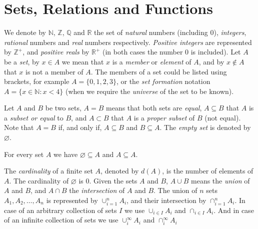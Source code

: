 %
%

\section{Sets, Relations and Functions}
\label{sec:sets}

We denote by $\mathbb{N}$, $\mathbb{Z}$, $\mathbb{Q}$ and $\mathbb{R}$ the set of \emph{natural} numbers (including $0$), \emph{integers}, \emph{rational} numbers and \emph{real} numbers respectively. \emph{Positive integers} are represented by $\mathbb{Z}^+$, and \emph{positive reals} by $\mathbb{R}^+$ (in both cases the number $0$ is included). Let $A$ be a \emph{set}, by $x\in A$ we mean that $x$ is a \emph{member} or \emph{element} of $A$, and by $x \notin A$ that $x$ is not a member of $A$. The members of a set could be listed using brackets, for example $A = \{0, 1, 2, 3\}$, or the \emph{set formation} notation $A = \{x \in \mathbb{N} : x < 4\}$ (when we require the \emph{universe} of the set to be known).

Let $A$ and $B$ be two sets, $A = B$ means that both sets are \emph{equal}, $A \subseteq B$ that $A$ is a \emph{subset or equal} to $B$, and $A \subset B$ that $A$ is a \emph{proper subset} of $B$ (not equal). Note that $A = B$ if, and only if, $A \subseteq B$ and $B \subseteq A$. The \emph{empty set} is denoted by $\varnothing$.

\begin{example}
For every set $A$ we have $\varnothing \subseteq A$ and $ A \subseteq A$.
\end{example}

The \emph{cardinality} of a finite set $A$, denoted by $d(A)$, is the number of elements of $A$. The cardinality of $\varnothing$ is 0. Given the sets $A$ and $B$, $A \cup B$ means the \emph{union} of $A$ and $B$, and $A \cap B$ the \emph{intersection} of $A$ and $B$. The union of $n$ sets $A_1, A_2, \ldots, A_n$ is represented by $\cup_{i=1}^n A_i$, and their intersection by $\cap_{i=1}^n A_i$. In case of an arbitrary collection of sets $I$ we use $\cup_{i \in I} A_i$ and $\cap_{i \in I} A_i$. And in case of an infinite collection of sets we use $\cup_{i}^{\infty} A_i$ and $\cap_{i}^{\infty} A_i$

